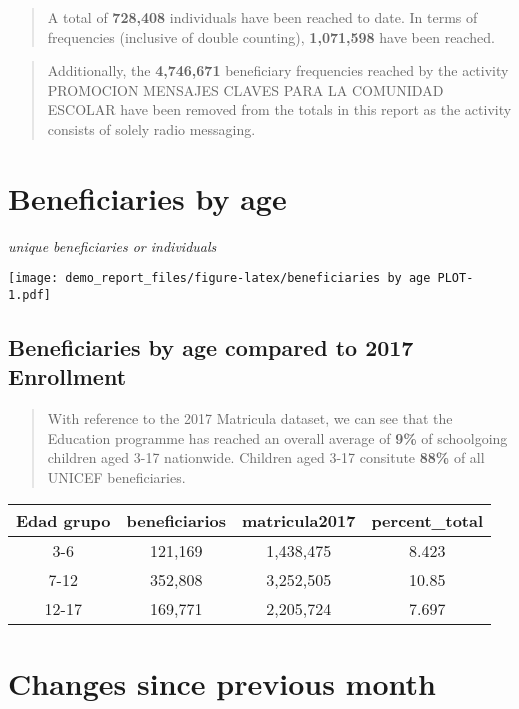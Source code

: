 \documentclass[
]{article}
\begin{document}
\begin{quote}
A total of \textbf{728,408} individuals have been reached to date. In
terms of frequencies (inclusive of double counting), \textbf{1,071,598}
have been reached.
\end{quote}

\begin{quote}
Additionally, the \textbf{4,746,671} beneficiary frequencies reached by
the activity PROMOCION MENSAJES CLAVES PARA LA COMUNIDAD ESCOLAR have
been removed from the totals in this report as the activity consists of
solely radio messaging.
\end{quote}

\hypertarget{beneficiaries-by-age}{%
\section{Beneficiaries by age}\label{beneficiaries-by-age}}

\emph{unique beneficiaries or individuals}

\texttt{[image: demo\_report\_files/figure-latex/beneficiaries by age PLOT-1.pdf]}

\hypertarget{beneficiaries-by-age-compared-to-2017-enrollment}{%
\subsection{Beneficiaries by age compared to 2017
Enrollment}\label{beneficiaries-by-age-compared-to-2017-enrollment}}

\begin{quote}
With reference to the 2017 Matricula dataset, we can see that the
Education programme has reached an overall average of \textbf{9\%} of
schoolgoing children aged 3-17 nationwide. Children aged 3-17 consitute
\textbf{88\%} of all UNICEF beneficiaries.
\end{quote}

\begin{longtable}[]{@{}cccc@{}}
\toprule
Edad grupo & beneficiarios & matricula2017 & percent\_total \\
\midrule
\endhead
3-6 & 121,169 & 1,438,475 & 8.423 \\
7-12 & 352,808 & 3,252,505 & 10.85 \\
12-17 & 169,771 & 2,205,724 & 7.697 \\
\bottomrule
\end{longtable}

\hypertarget{changes-since-previous-month}{%
\section{Changes since previous
month}\label{changes-since-previous-month}}
\end{document}

